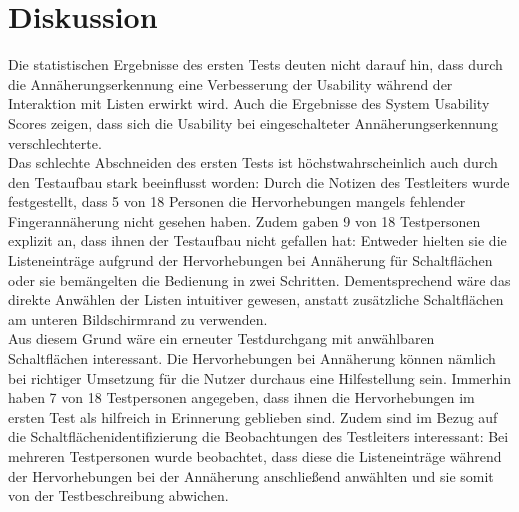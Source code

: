 \documentclass[12pt,bibliography=totocnumbered,listof=totocnumbered,abstracton]{scrreprt}
\begin{document}
\chapter{Diskussion}
Die statistischen Ergebnisse des ersten Tests deuten nicht darauf hin, dass durch die Annäherungserkennung eine Verbesserung der Usability während der Interaktion mit Listen erwirkt wird. Auch die Ergebnisse des System Usability Scores zeigen, dass sich die Usability bei eingeschalteter Annäherungserkennung verschlechterte.\\
Das schlechte Abschneiden des ersten Tests ist höchstwahrscheinlich auch durch den Testaufbau stark beeinflusst worden: Durch die Notizen des Testleiters wurde festgestellt, dass 5 von 18 Personen die Hervorhebungen mangels fehlender Fingerannäherung nicht gesehen haben. Zudem gaben 9 von 18 Testpersonen explizit an, dass ihnen der Testaufbau nicht gefallen hat: Entweder hielten sie die Listeneinträge aufgrund der Hervorhebungen bei Annäherung für Schaltflächen oder sie bemängelten die Bedienung in zwei Schritten. Dementsprechend wäre das direkte Anwählen der Listen intuitiver gewesen, anstatt zusätzliche Schaltflächen am unteren Bildschirmrand zu verwenden.\\
Aus diesem Grund wäre ein erneuter Testdurchgang mit anwählbaren Schaltflächen interessant. Die Hervorhebungen bei Annäherung können nämlich bei richtiger Umsetzung für die Nutzer durchaus eine Hilfestellung sein. Immerhin haben 7 von 18 Testpersonen angegeben, dass ihnen die Hervorhebungen im ersten Test als hilfreich in Erinnerung geblieben sind. Zudem sind im Bezug auf die Schaltflächenidentifizierung die Beobachtungen des Testleiters interessant: Bei mehreren Testpersonen wurde beobachtet, dass diese die Listeneinträge während der Hervorhebungen bei der Annäherung anschließend anwählten und sie somit von der Testbeschreibung abwichen.
\end{document}
